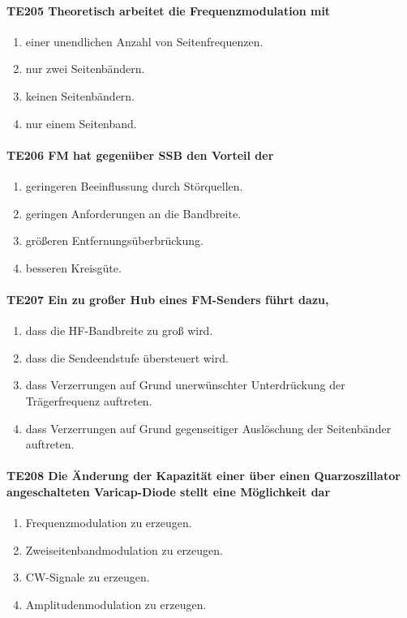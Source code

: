 \documentclass[8pt]{article}
\begin{document}
\begin{enumerate}
\begin{enumerate}[nolistsep,label=\Alph*]
\paragraph*{TE205 Theoretisch arbeitet die Frequenzmodulation mit}
\begin{enumerate}[nolistsep,label=\Alph*]
\item einer unendlichen Anzahl von Seitenfrequenzen.
\item nur zwei Seitenbändern.
\item keinen Seitenbändern.
\item nur einem Seitenband.
\end{enumerate}

\paragraph*{TE206 FM hat gegenüber SSB den Vorteil der} 
\begin{enumerate}[nolistsep,label=\Alph*]
\item geringeren Beeinflussung durch Störquellen.
\item geringen Anforderungen an die Bandbreite.
\item größeren Entfernungsüberbrückung.
\item besseren Kreisgüte.
\end{enumerate}

\paragraph*{TE207 Ein zu großer Hub eines FM-Senders führt dazu,}
\begin{enumerate}[nolistsep,label=\Alph*]
\item dass die HF-Bandbreite zu groß wird.
\item dass die Sendeendstufe übersteuert wird.
\item dass Verzerrungen auf Grund unerwünschter Unterdrückung der Trägerfrequenz auftreten.
\item dass Verzerrungen auf Grund gegenseitiger Auslöschung der Seitenbänder auftreten.
\end{enumerate}

\paragraph*{TE208 Die Änderung der Kapazität einer über einen Quarzoszillator angeschalteten Varicap-Diode stellt eine Möglichkeit dar} 
\begin{enumerate}[nolistsep,label=\Alph*]
\item Frequenzmodulation zu erzeugen.
\item Zweiseitenbandmodulation zu erzeugen.
\item CW-Signale zu erzeugen.
\item Amplitudenmodulation zu erzeugen.
\end{enumerate}


\end{enumerate}
\end{enumerate}
\end{document}
